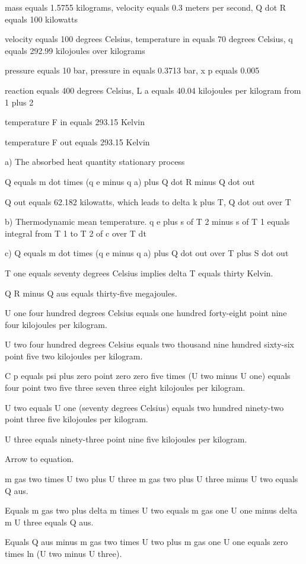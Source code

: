 mass equals 1.5755 kilograms, velocity equals 0.3 meters per second, Q dot R equals 100 kilowatts

velocity equals 100 degrees Celsius, temperature in equals 70 degrees Celsius, q equals 292.99 kilojoules over kilograms

pressure equals 10 bar, pressure in equals 0.3713 bar, x p equals 0.005

reaction equals 400 degrees Celsius, L a equals 40.04 kilojoules per kilogram from 1 plus 2

temperature F in equals 293.15 Kelvin

temperature F out equals 293.15 Kelvin

a) The absorbed heat quantity stationary process

Q equals m dot times (q e minus q a) plus Q dot R minus Q dot out

Q out equals 62.182 kilowatts, which leads to delta k plus T, Q dot out over T

b) Thermodynamic mean temperature. q e plus s of T 2 minus s of T 1 equals integral from T 1 to T 2 of c over T dt

c) Q equals m dot times (q e minus q a) plus Q dot out over T plus S dot out

T one equals seventy degrees Celsius implies delta T equals thirty Kelvin.

Q R minus Q aus equals thirty-five megajoules.

U one four hundred degrees Celsius equals one hundred forty-eight point nine four kilojoules per kilogram.

U two four hundred degrees Celsius equals two thousand nine hundred sixty-six point five two kilojoules per kilogram.

C p equals psi plus zero point zero zero five times (U two minus U one) equals four point two five three seven three eight kilojoules per kilogram.

U two equals U one (seventy degrees Celsius) equals two hundred ninety-two point three five kilojoules per kilogram.

U three equals ninety-three point nine five kilojoules per kilogram.

Arrow to equation.

m gas two times U two plus U three m gas two plus U three minus U two equals Q aus.

Equals m gas two plus delta m times U two equals m gas one U one minus delta m U three equals Q aus.

Equals Q aus minus m gas two times U two plus m gas one U one equals zero times ln (U two minus U three).

